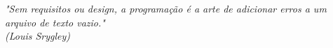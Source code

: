 \begin{epigrafe}
  \vspace*{\fill}
  \begin{flushright}
    \textit{"Sem requisitos ou design, a programação é a arte de adicionar erros a um arquivo de texto vazio." \\
    (Louis Srygley)}
  \end{flushright}
\end{epigrafe}